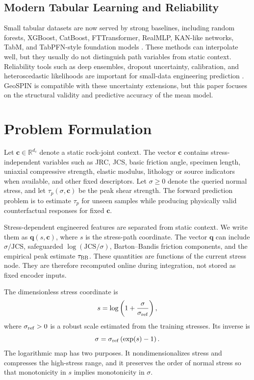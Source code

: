 \documentclass[journal]{IEEEtran}
\begin{document}
\subsection{Modern Tabular Learning and Reliability}
Small tabular datasets are now served by strong baselines, including random forests, XGBoost, CatBoost, FTTransformer, RealMLP, KAN-like networks, TabM, and TabPFN-style foundation models \cite{breiman2001random,chen2016xgboost,prokhorenkova2018catboost,gorishniy2021revisiting,hollmann2023tabpfn,liu2024kan,vaswani2017attention}. These methods can interpolate well, but they usually do not distinguish path variables from static context. Reliability tools such as deep ensembles, dropout uncertainty, calibration, and heteroscedastic likelihoods are important for small-data engineering prediction \cite{lakshminarayanan2017simple,gal2016dropout,guo2017calibration,kuleshov2018accurate,kendall2017uncertainties,bishop1994mixture,kennedy2001bayesian,sacks1989design}. GeoSPIN is compatible with these uncertainty extensions, but this paper focuses on the structural validity and predictive accuracy of the mean model.

\section{Problem Formulation}
Let $\mathbf{c}\in\mathbb{R}^{d_c}$ denote a static rock-joint context. The vector $\mathbf{c}$ contains stress-independent variables such as JRC, JCS, basic friction angle, specimen length, uniaxial compressive strength, elastic modulus, lithology or source indicators when available, and other fixed descriptors. Let $\sigma\ge0$ denote the queried normal stress, and let $\tau_p(\sigma,\mathbf{c})$ be the peak shear strength. The forward prediction problem is to estimate $\tau_p$ for unseen samples while producing physically valid counterfactual responses for fixed $\mathbf{c}$.

Stress-dependent engineered features are separated from static context. We write them as $\mathbf{q}(s,\mathbf{c})$, where $s$ is the stress-path coordinate. The vector $\mathbf{q}$ can include $\sigma/\mathrm{JCS}$, safeguarded $\log(\mathrm{JCS}/\sigma)$, Barton--Bandis friction components, and the empirical peak estimate $\tau_{\rm BB}$. These quantities are functions of the current stress node. They are therefore recomputed online during integration, not stored as fixed encoder inputs.

The dimensionless stress coordinate is
\begin{equation}
s=\log\left(1+\frac{\sigma}{\sigma_{\rm ref}}\right),
\label{eq:sdef}
\end{equation}
where $\sigma_{\rm ref}>0$ is a robust scale estimated from the training stresses. Its inverse is
\begin{equation}
\sigma=\sigma_{\rm ref}\left(\exp(s)-1\right).
\label{eq:sinv}
\end{equation}
The logarithmic map has two purposes. It nondimensionalizes stress and compresses the high-stress range, and it preserves the order of normal stress so that monotonicity in $s$ implies monotonicity in $\sigma$.
\end{document}
